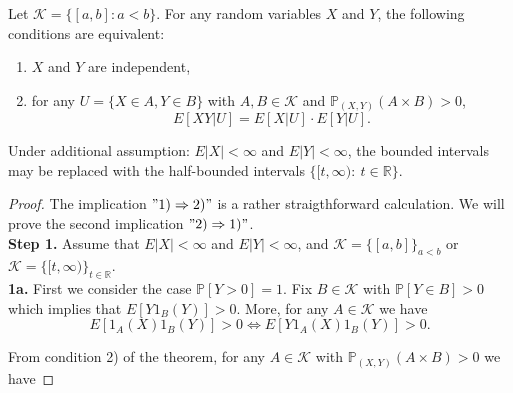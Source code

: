 \documentclass[10pt,a4paper]{amsart}
\newcommand{\KK}{\mathcal{K}}
\newcommand{\PP}{\mathbb{P}}
\newcommand{\R}{\mathbb{R}}
\begin{document}
\begin{theorem}\label{T1}
Let  $\mathcal{K}=\{[a,b]\colon a<b\}$. For any random variables $X$ and $Y$, the following conditions are equivalent:
\begin{enumerate}
\item[1)] $X$ and $Y$ are independent,
\item[2)] for any $U=\{X\in A, Y\in B\}$ with $A, B\in \mathcal{K}$ and $\PP_{(X,Y)}(A\times B)>0$,$$E[XY|U]=E[X| U]\cdot E[Y|U].$$

\end{enumerate}
Under additional assumption: $E|X|<\infty$ and $E|Y|<\infty$, the  bounded intervals may be replaced with the half-bounded intervals $\{[t,\infty)\colon\ t\in \R\}$.
\end{theorem}

\begin{proof}
 The implication $"1) \Rightarrow 2)"$ is a rather straigthforward calculation. We will prove the second implication $"2)\Rightarrow 1)"$.\\
\textbf{Step 1.}  Assume  that $E|X|<\infty$ and $E|Y|<\infty$, and $\KK=\{[a,b]\}_{a<b}$ or $\KK=\{[t,\infty)\}_{t\in\R}$.\\
\textbf{1a.}  First we consider the case $\PP[Y>0]=1$. Fix $B\in\KK$ with  $\PP[Y\in B]>0$ which implies that $E[Y1_B(Y)]>0$. More, for any $A\in\KK$ we have  
$$E[1_A(X)1_B(Y)]>0\Leftrightarrow E[Y1_A(X)1_B(Y)]>0.$$

From condition 2) of the theorem, for any $A\in\KK$ with $\PP_{(X,Y)}(A\times B)>0$ we have


\end{proof}
\end{document}
